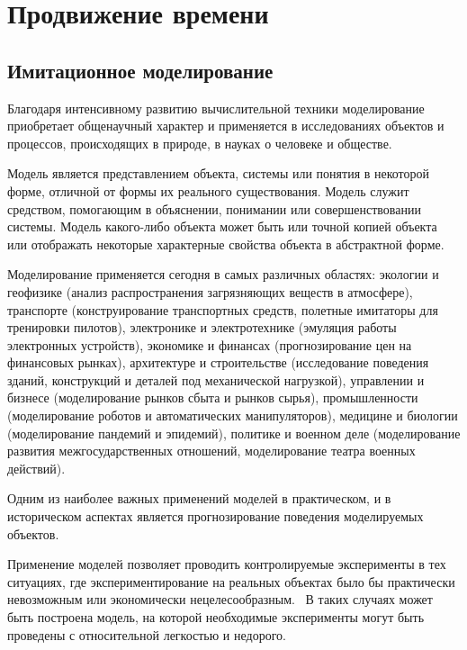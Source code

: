 \chapter{Продвижение времени} \label{chapt1}

\section{Имитационное моделирование} \label{sect1}



Благодаря интенсивному развитию вычислительной техники моделирование приобретает общенаучный характер и применяется в исследованиях объектов и процессов, происходящих в природе, в науках о человеке и обществе.

Модель является представлением объекта, системы или понятия в некоторой форме, отличной от формы их реального существования. Модель служит средством, помогающим в объяснении, понимании или совершенствовании системы. Модель какого-либо объекта может быть или точной копией объекта или отображать некоторые характерные свойства объекта в абстрактной форме.

Моделирование применяется сегодня в самых различных областях: экологии и геофизике (анализ распространения загрязняющих веществ в атмосфере), транспорте (конструирование транспортных средств, полетные имитаторы для тренировки пилотов), электронике и электротехнике (эмуляция работы электронных устройств), экономике и финансах (прогнозирование цен на финансовых рынках), архитектуре и строительстве (исследование поведения зданий, конструкций и деталей под механической нагрузкой), управлении и бизнесе (моделирование рынков сбыта и рынков сырья), промышленности (моделирование роботов и автоматических манипуляторов), медицине и биологии (моделирование пандемий и эпидемий), политике и военном деле (моделирование развития межгосударственных отношений, моделирование театра военных действий).

Одним из наиболее важных применений моделей в практическом, и в историческом аспектах является прогнозирование поведения моделируемых объектов.

Применение моделей позволяет проводить контролируемые эксперименты в тех ситуациях, где экспериментирование на реальных объектах было бы практически невозможным или экономически нецелесообразным.~\cite{Shennon} В таких случаях может быть построена модель, на которой необходимые эксперименты могут быть проведены с относительной легкостью и недорого.

